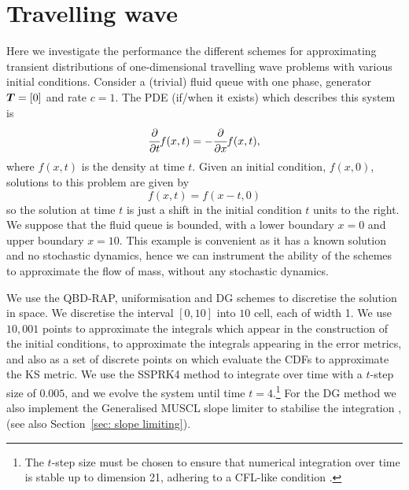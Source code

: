 \section{Travelling wave}\label{sec: wave num}
Here we investigate the performance the different schemes for approximating transient distributions of one-dimensional travelling wave problems with various initial conditions. Consider a (trivial) fluid queue with one phase, generator \(\boldsymbol T=[0]\) and rate \(c=1\). The PDE (if/when it exists) which describes this system is 
\[\cfrac{\partial}{\partial t} f(x,t) = -\cfrac{\partial}{\partial x} f(x,t),\]
where \(f(x,t)\) is the density at time \(t\). Given an initial condition, \(f(x,0)\), solutions to this problem are given by 
\[f(x,t) = f(x-t,0)\]
so the solution at time \(t\) is just a shift in the initial condition \(t\) units to the right. We suppose that the fluid queue is bounded, with a lower boundary \(x=0\) and upper boundary \(x=10\). This example is convenient as it has a known solution and no stochastic dynamics, hence we can instrument the ability of the schemes to approximate the flow of mass, without any stochastic dynamics. 

We use the QBD-RAP, uniformisation and DG schemes to discretise the solution in space. We discretise the interval \([0,10]\) into \(10\) cell, each of width 1. We use \(10,001\) points to approximate the integrals which appear in the construction of the initial conditions, to approximate the integrals appearing in the error metrics, and also as a set of discrete points on which evaluate the CDFs to approximate the KS metric. We use the SSPRK4 method to integrate over time with a \(t\)-step size of \(0.005\), and we evolve the system until time \(t=4\).\footnote{The \(t\)-step size must be chosen to ensure that numerical integration over time is stable up to dimension 21, adhering to a CFL-like condition \cite[Section~4.8]{nodalDGBook}.} For the DG method we also implement the Generalised MUSCL slope limiter to stabilise the integration \citep{c99}, \citep[Section~5.6.2]{nodalDGBook} (see also Section~\ref{sec: slope limiting}). 

